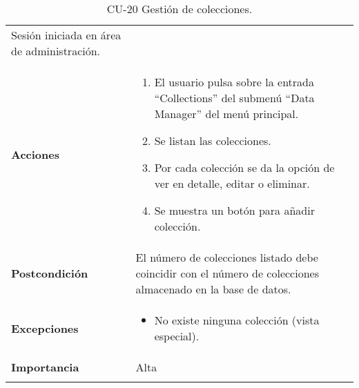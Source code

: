 \begin{longtable}[]{@{}ll@{}}
\begin{minipage}[t]{0.76\columnwidth}
Sesión iniciada en área de administración.\strut
\end{minipage}\tabularnewline
\begin{minipage}[t]{0.18\columnwidth}\raggedright
\textbf{Acciones}\strut
\end{minipage} & \begin{minipage}[t]{0.76\columnwidth}\raggedright
\begin{enumerate}
\def\labelenumi{\arabic{enumi}.}
\tightlist
\item
  El usuario pulsa sobre la entrada ``Collections'' del submenú ``Data
  Manager'' del menú principal.
\item
  Se listan las colecciones.
\item
  Por cada colección se da la opción de ver en detalle, editar o
  eliminar.
\item
  Se muestra un botón para añadir colección.
\end{enumerate}\strut
\end{minipage}\tabularnewline
\begin{minipage}[t]{0.18\columnwidth}\raggedright
\textbf{Postcondición}\strut
\end{minipage} & \begin{minipage}[t]{0.76\columnwidth}\raggedright
El número de colecciones listado debe coincidir con el número de
colecciones almacenado en la base de datos.\strut
\end{minipage}\tabularnewline
\begin{minipage}[t]{0.18\columnwidth}\raggedright
\textbf{Excepciones}\strut
\end{minipage} & \begin{minipage}[t]{0.76\columnwidth}\raggedright
\begin{itemize}
\tightlist
\item
  No existe ninguna colección (vista especial).
\end{itemize}\strut
\end{minipage}\tabularnewline
\begin{minipage}[t]{0.18\columnwidth}\raggedright
\textbf{Importancia}\strut
\end{minipage} & \begin{minipage}[t]{0.76\columnwidth}\raggedright
Alta\strut
\end{minipage}\tabularnewline
\bottomrule
\caption{CU-20 Gestión de colecciones.}
\end{longtable}

